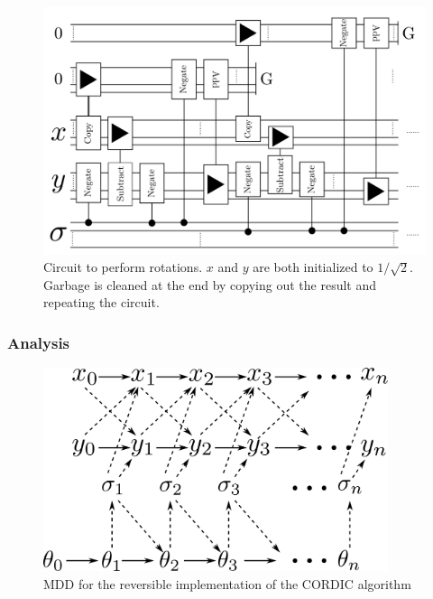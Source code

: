             \begin{figure}
                \capstart
                \centering
                \includegraphics[width=\textwidth]{images/CORDICRotations}
                \caption{Circuit to perform rotations.
                         $x$ and $y$ are both initialized to $1/\sqrt{2}$.
                         Garbage is cleaned at the end by copying out the result and repeating the circuit.}
                \label{fig:CORDICRotations}
            \end{figure}
        \subsubsection{Analysis}
	\begin{figure}
                \capstart
                \centering
                \includegraphics[width=0.9\textwidth]{images/CordicMDD}
                \caption{MDD for the reversible implementation of the CORDIC algorithm}
                \label{fig:CordicMDD}
        \end{figure}

